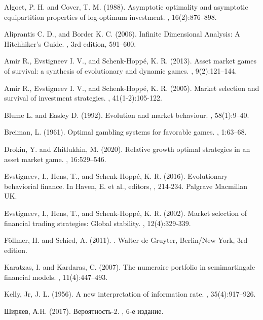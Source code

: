 \documentclass[a4paper,12pt,russian]{article} %
\theoremstyle{definition}
\begin{document}
\begin{thebibliography}{}

 Algoet, P. H. and Cover, T. M. (1988). 
\newblock Asymptotic optimality and asymptotic equipartition properties of log-optimum investment. 
, 16(2):876–898.


 Aliprantis C. D., and Border K. C. (2006).
\newblock Infinite Dimensional Analysis: A Hitchhiker’s Guide.
, 3rd edition, 591–600.


 Amir R., Evstigneev I. V., and Schenk-Hoppé, K. R. (2013).
\newblock Asset market games of survival: a synthesis of evolutionary and dynamic games.
, 9(2):121–144.

 Amir R., Evstigneev I. V., and Schenk-Hoppé, K. R. (2005).
\newblock Market selection and survival of investment strategies.
, 41(1-2):105-122.

 Blume L. and Easley D. (1992).
\newblock Evolution and market behaviour.
, 58(1):9–40.


 Breiman, L. (1961). 
\newblock Optimal gambling systems for favorable games.
, 1:63–68.


 Drokin, Y. and Zhitlukhin, M. (2020).
\newblock Relative growth optimal strategies in an asset market game.
, 16:529–546.


 Evstigneev, I., Hens, T., and Schenk-Hoppé, K. R. (2016).
\newblock Evolutionary behaviorial finance. In Haven, E. et al., editors, 
, 214-234. Palgrave Macmillan UK.

 Evstigneev, I., Hens, T., and Schenk-Hoppé, K. R. (2002).
\newblock Market selection of financial trading strategies: Global stability. 
, 12(4):329-339.

 Föllmer, H. and Schied, A. (2011). 
. Walter de Gruyter, Berlin/New York, 3rd edition.


 Karatzas, I. and Kardaras, C. (2007). 
\newblock The numeraire portfolio in semimartingale financial models. 
, 11(4):447–493.


 Kelly, Jr, J. L. (1956). 
\newblock A new interpretation of information rate. 
, 35(4):917–926.


 Ширяев, А.Н. (2017). 
\newblock Вероятность-2.
, 
    6-е издание.
  
\end{thebibliography}
\end{document}

